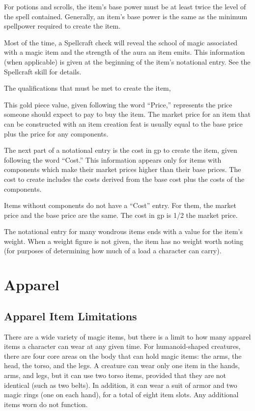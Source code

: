     For potions and scrolls, the item's base power must be at least twice the level of the spell contained.
    Generally, an item's base power is the same as the minimum spellpower required to create the item.

     Most of the time, a Spellcraft check will reveal the school of magic associated with a magic item and the strength of the aura an item emits.
    This information (when applicable) is given at the beginning of the item's notational entry.
    See the Spellcraft skill for details.

     The qualifications that must be met to create the item, %

     This gold piece value, given following the word ``Price,'' represents the price someone should expect to pay to buy the item.
    The market price for an item that can be constructed with an item creation feat is usually equal to the base price plus the price for any components.

     The next part of a notational entry is the cost in gp to create the item, given following the word ``Cost.'' This information appears only for items with components which make their market prices higher than their base prices.
    The cost to create includes the costs derived from the base cost plus the costs of the components.

    Items without components do not have a ``Cost'' entry.
    For them, the market price and the base price are the same.
    The cost in gp is 1/2 the market price.

     The notational entry for many wondrous items ends with a value for the item's weight.
    When a weight figure is not given, the item has no weight worth noting (for purposes of determining how much of a load a character can carry).

\section{Apparel}

    \subsection{Apparel Item Limitations}

        There are a wide variety of magic items, but there is a limit to how many apparel items a character can wear at any given time.
        For humanoid-shaped creatures, there are four core areas on the body that can hold magic items: the arms, the head, the torso, and the legs.
        A creature can wear only one item in the hands, arms, and legs, but it can use two torso items, provided that they are not identical (such as two belts).
        In addition, it can wear a suit of armor and two magic rings (one on each hand), for a total of eight item slots.
        Any additional items worn do not function.

